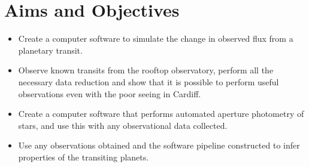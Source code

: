 \section{Aims and Objectives}
\begin{itemize}
\item Create a computer software to simulate the change in observed flux from a planetary transit.
\item Observe known transits from the rooftop observatory, perform all the necessary data reduction and show that it is possible to perform useful observations even with the poor seeing in Cardiff.
\item Create a computer software that performs automated aperture photometry of stars, and use this with any observational data collected.
\item Use any observations obtained and the software pipeline constructed to infer properties of the transiting planets.
\end{itemize}
